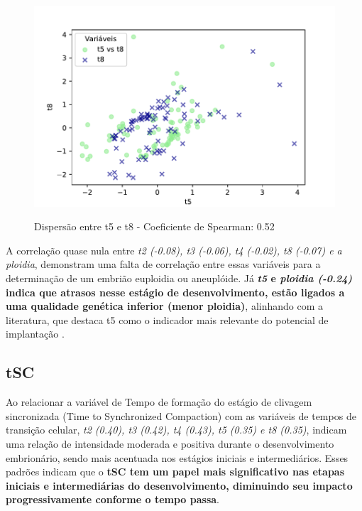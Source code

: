 \begin{figure}[h]
    \begin{minipage}[b]{0.45\linewidth}
        \label{fig:t5-t8}
        \centering
        \includegraphics[scale=0.48]{figuras/Spearman/t5-t8.pdf}
        \caption{Dispersão entre t5 e t8 - Coeficiente de Spearman: 0.52}
        \vspace{0.3cm}
        \begin{minipage}{\linewidth}
            \centering
        \end{minipage}
    \end{minipage}
\end{figure}
\FloatBarrier

A correlação quase nula entre \textit{t2 (-0.08), t3 (-0.06), t4 (-0.02), t8 (-0.07) e a ploidia}, demonstram uma falta de correlação entre essas variáveis para a determinação de um embrião euploidia ou aneuplóide. Já \textbf{\textit{t5} e \textit{ploidia (-0.24)} indica que atrasos nesse estágio de desenvolvimento, estão ligados a uma qualidade genética inferior (menor ploidia)}, alinhando com a literatura, que destaca t5 como o indicador mais relevante do potencial de implantação . 

\subsection*{tSC}
Ao relacionar a variável de Tempo de formação do estágio de clivagem sincronizada (Time to Synchronized Compaction) com as variáveis de tempos de transição celular, \textit{t2 (0.40), t3 (0.42), t4 (0.43), t5 (0.35) e t8 (0.35)}, indicam uma relação de intensidade moderada e positiva durante o desenvolvimento embrionário, sendo mais acentuada nos estágios iniciais e intermediários. Esses padrões indicam que o \textbf{tSC tem um papel mais significativo nas etapas iniciais e intermediárias do desenvolvimento, diminuindo seu impacto progressivamente conforme o tempo passa}. 

